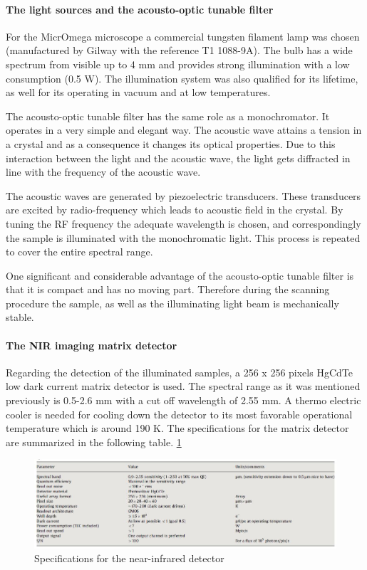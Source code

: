 \paragraph{The light sources and the acousto-optic tunable filter}

For the MicrOmega microscope a commercial tungsten ﬁlament lamp was chosen (manufactured by Gilway with the reference T1 1088-9A). The bulb has a wide spectrum from visible up to 4 mm and provides strong illumination with a low consumption (0.5 W). The illumination system was also qualified for its lifetime, as well for its operating in vacuum and at low temperatures.

The acousto-optic tunable filter has the same role as a monochromator. It operates in a very simple and elegant way. The acoustic wave attains a tension in a crystal and as a consequence it changes its optical properties. Due to this interaction between the light and the acoustic wave, the light gets diffracted in line with the frequency of the acoustic wave.

The acoustic waves are generated by piezoelectric transducers. These transducers are excited by radio-frequency which leads to acoustic field in the crystal. By tuning the RF frequency the adequate wavelength is chosen, and correspondingly the sample is illuminated with the monochromatic light. This process is repeated to cover the entire spectral range.

One significant and considerable advantage of the acousto-optic tunable filter is that it is compact and has no moving part. Therefore during the scanning procedure the sample, as well as the illuminating light beam is mechanically stable.

\paragraph{The NIR imaging matrix detector}
Regarding the detection of the illuminated samples, a 256 x 256 pixels HgCdTe low dark current matrix detector is used. The spectral range as it was mentioned previously is 0.5-2.6 mm with a cut off wavelength of 2.55 mm.
A thermo electric cooler is needed for cooling down the detector to its most favorable operational temperature which is around 190 K. The speciﬁcations for the matrix detector are summarized in the following table.
\ref{fig:Specs_for_NIR_detector_MicrOmega}

\begin{figure}[htb]
  \centering
  \includegraphics[scale=0.6]{figures/BFfig/Specs_for_NIR_detector_MicrOmega}
  \caption{Specifications for the near-infrared detector}
  \label{fig:Specs_for_NIR_detector_MicrOmega}
\end{figure}


